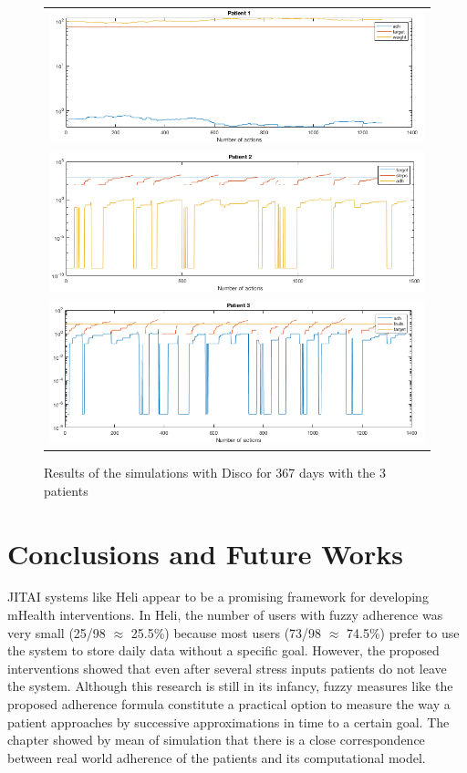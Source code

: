 \documentclass[graybox]{svmult}
\begin{document}
\begin{figure}
  \begin{center}
  \begin{tabular}{c}
    \includegraphics[scale=0.5]{Patient1-365-fuzzy.png}\\
    \includegraphics[scale=0.5]{Patient2-365-fuzzy.png}\\
    \includegraphics[scale=0.5]{Patient3-365-fuzzy.png}\\
    \end{tabular}
    \caption{Results of the simulations with Disco for 367 days with the 3 patients}
     \label{Fig.TimeSeries}
\end{center}
\end{figure} 

\section {Conclusions and Future Works}
\label{sec.conclusions}

JITAI systems like Heli appear to be a promising framework for developing mHealth interventions. In Heli, the number of users with fuzzy adherence was very small (25/98 $\approx$ 25.5\%) because most users (73/98 $\approx$ 74.5\%) prefer to use the system to store daily data without a specific goal. However, the  proposed interventions showed that even after several stress inputs patients do not leave the system. Although this research is still in its infancy, fuzzy measures like the proposed adherence formula constitute a practical option  to measure the way a patient approaches by successive approximations in time to a certain goal. The chapter showed by mean of simulation that there is a close correspondence between real world adherence of the patients and its computational model. 
\end{document}
